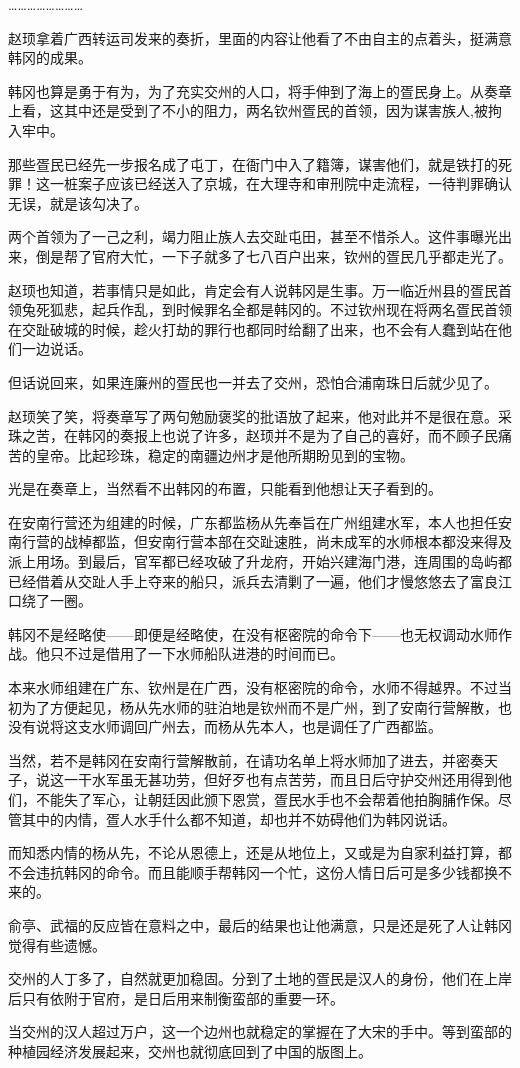 ……………………

赵顼拿着广西转运司发来的奏折，里面的内容让他看了不由自主的点着头，挺满意韩冈的成果。

韩冈也算是勇于有为，为了充实交州的人口，将手伸到了海上的疍民身上。从奏章上看，这其中还是受到了不小的阻力，两名钦州疍民的首领，因为谋害族人,被拘入牢中。

那些疍民已经先一步报名成了屯丁，在衙门中入了籍簿，谋害他们，就是铁打的死罪！这一桩案子应该已经送入了京城，在大理寺和审刑院中走流程，一待判罪确认无误，就是该勾决了。

两个首领为了一己之利，竭力阻止族人去交趾屯田，甚至不惜杀人。这件事曝光出来，倒是帮了官府大忙，一下子就多了七八百户出来，钦州的疍民几乎都走光了。

赵顼也知道，若事情只是如此，肯定会有人说韩冈是生事。万一临近州县的疍民首领兔死狐悲，起兵作乱，到时候罪名全都是韩冈的。不过钦州现在将两名疍民首领在交趾破城的时候，趁火打劫的罪行也都同时给翻了出来，也不会有人蠢到站在他们一边说话。

但话说回来，如果连廉州的疍民也一并去了交州，恐怕合浦南珠日后就少见了。

赵顼笑了笑，将奏章写了两句勉励褒奖的批语放了起来，他对此并不是很在意。采珠之苦，在韩冈的奏报上也说了许多，赵顼并不是为了自己的喜好，而不顾子民痛苦的皇帝。比起珍珠，稳定的南疆边州才是他所期盼见到的宝物。

光是在奏章上，当然看不出韩冈的布置，只能看到他想让天子看到的。

在安南行营还为组建的时候，广东都监杨从先奉旨在广州组建水军，本人也担任安南行营的战棹都监，但安南行营本部在交趾速胜，尚未成军的水师根本都没来得及派上用场。到最后，官军都已经攻破了升龙府，开始兴建海门港，连周围的岛屿都已经借着从交趾人手上夺来的船只，派兵去清剿了一遍，他们才慢悠悠去了富良江口绕了一圈。

韩冈不是经略使——即便是经略使，在没有枢密院的命令下——也无权调动水师作战。他只不过是借用了一下水师船队进港的时间而已。

本来水师组建在广东、钦州是在广西，没有枢密院的命令，水师不得越界。不过当初为了方便起见，杨从先水师的驻泊地是钦州而不是广州，到了安南行营解散，也没有说将这支水师调回广州去，而杨从先本人，也是调任了广西都监。

当然，若不是韩冈在安南行营解散前，在请功名单上将水师加了进去，并密奏天子，说这一干水军虽无甚功劳，但好歹也有点苦劳，而且日后守护交州还用得到他们，不能失了军心，让朝廷因此颁下恩赏，疍民水手也不会帮着他拍胸脯作保。尽管其中的内情，疍人水手什么都不知道，却也并不妨碍他们为韩冈说话。

而知悉内情的杨从先，不论从恩德上，还是从地位上，又或是为自家利益打算，都不会违抗韩冈的命令。而且能顺手帮韩冈一个忙，这份人情日后可是多少钱都换不来的。

俞亭、武福的反应皆在意料之中，最后的结果也让他满意，只是还是死了人让韩冈觉得有些遗憾。

交州的人丁多了，自然就更加稳固。分到了土地的疍民是汉人的身份，他们在上岸后只有依附于官府，是日后用来制衡蛮部的重要一环。

当交州的汉人超过万户，这一个边州也就稳定的掌握在了大宋的手中。等到蛮部的种植园经济发展起来，交州也就彻底回到了中国的版图上。

